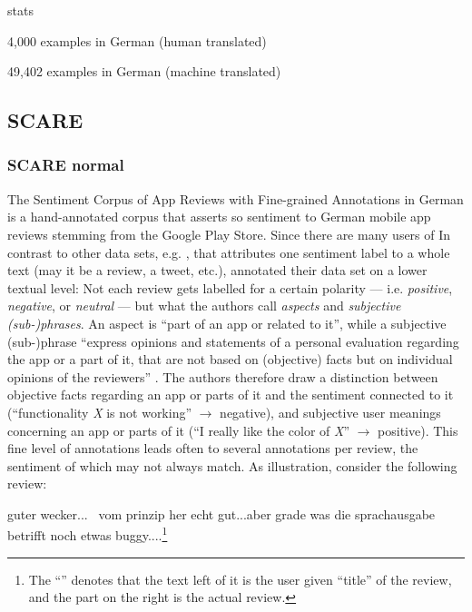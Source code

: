 stats

4,000 examples in German (human translated)

49,402 examples in German (machine translated)



\subsection{SCARE}

\subsubsection{SCARE normal}

The Sentiment Corpus of App Reviews with Fine-grained Annotations in German \cite{sanger2016scare} is a hand-annotated corpus that asserts so sentiment to German mobile app reviews stemming from the Google Play Store.
Since there are many users of 
In contrast to other data sets, e.g. \citep{socher2013recursive, go2009twitter}, that attributes one sentiment label to a whole text (may it be a review, a tweet, etc.), \cite{sanger2016scare} annotated their data set on a lower textual level:
Not each review gets labelled for a certain polarity --- i.e. \emph{positive}, \emph{negative}, or \emph{neutral} --- but what the authors call \emph{aspects} and \emph{subjective (sub-)phrases}.
An aspect is ``part of an app or related to it'', while a subjective (sub-)phrase ``express opinions and statements of a
personal evaluation regarding the app or a part of it, that are not based on (objective) facts but on individual opinions of the reviewers'' \citep[p.~1116]{sanger2016scare}.
The authors therefore draw a distinction between objective facts regarding an app or parts of it and the sentiment connected to it (``functionality \emph{X} is not working'' $\rightarrow$ negative), and subjective user meanings concerning an app or parts of it (``I really like the color of \emph{X}'' $\rightarrow$ positive).
This fine level of annotations leads often to several annotations per review, the sentiment of which may not always match.
As illustration, consider the following review:

\begin{examples}
	\label{ex:fine-grained-anno}
	\item guter wecker... \textbar\textbar\ vom prinzip her echt gut...aber grade was die sprachausgabe betrifft noch etwas buggy....\footnote{The ``\textbar\textbar'' denotes that the text left of it is the user given ``title'' of the review, and the part on the right is the actual review.}
\end{examples}

